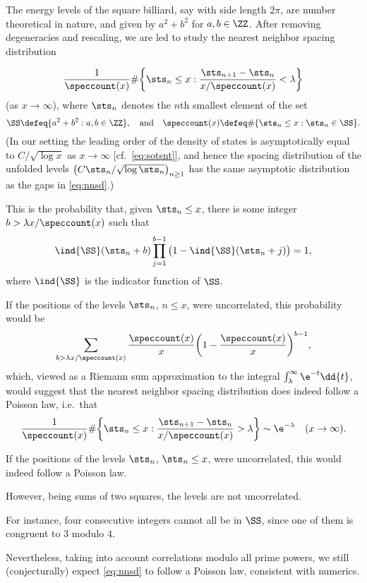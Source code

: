 \documentclass[12pt, reqno, twoside, letterpaper]{amsart}
\begin{document}
The energy levels of the square billiard, say with side length 
$2\pi$, are number theoretical in nature, and given by 
$a^2 + b^2$ for $a,b \in \ZZ$.
%
After removing degeneracies and rescaling, we are led to study 
the nearest neighbor spacing distribution 

\begin{equation}
 \label{eq:nnsd}
 \frac{1}{\speccount(x)}
  \#
   \bigg\{
    \sts_{n} \le x : \frac{\sts_{n + 1} - \sts_{n}}{x/\speccount(x)} < \lambda 
   \bigg\} 
\end{equation}
(as $x \to \infty$), where $\sts_n$ denotes the $n$th smallest 
element of the set  
\begin{equation}
 \label{eq:defSSN}
 \SS \defeq \{a^2 + b^2 : a,b \in \ZZ\}, 
  \quad 
   \text{and}
    \quad 
     \speccount(x)
      \defeq 
       \#\{\sts_{n} \le x : \sts_n \in \SS\}.
\end{equation}
%
(In our setting the leading order of the density of states is
asymptotically equal to $C/\sqrt{\log x}$ as $x \to \infty$ [cf.\   
\eqref{eq:sotsnt}], and hence the spacing distribution of the 
unfolded levels $\big(C\sts_n/\sqrt{\log \sts_n}\big)_{n \ge 1}$ 
has the same asymptotic distribution as the gaps in 
\eqref{eq:nnsd}.)

%
\begin{nixnix}
% 
This is the probability that, given $\sts_n \le x$, there is some 
integer $b > \lambda x/\speccount(x)$ such that 
\[
\ind{\SS}(\sts_n + b)
 \prod_{j = 1}^{b - 1} 
  \big(1 - \ind{\SS}(\sts_n + j)\big)
   =
    1,
\]
where $\ind{\SS}$ is the indicator function of $\SS$.

If the positions of the levels $\sts_n$, $n \le x$, were 
uncorrelated, this probability would be 
\[
\sum_{b > \lambda x/\speccount(x)}
 \frac{\speccount(x)}{x}
  \bigg(1 - \frac{\speccount(x)}{x}\bigg)^{b - 1},
\]
which, viewed as a Riemann sum approximation to the integral 
$\int_{\lambda}^{\infty} \e^{-t} \dd{t}$, would suggest that 
the nearest neighbor spacing distribution does indeed follow 
a Poisson law, i.e.\ that 
\[
\frac{1}{\speccount(x)}
 \#\bigg\{\sts_{n} \le x : \frac{\sts_{n + 1} - \sts_{n}}{x/\speccount(x)} > \lambda \bigg\}
  \sim 
   \e^{-\lambda}
    \quad 
     (x \to \infty).
\]

If the positions of the levels $\sts_n$, $\sts_n \le x$, were 
uncorrelated, this would indeed follow a Poisson law.

However, being sums of two squares, the levels are not 
uncorrelated.

For instance, four consecutive integers cannot all be in $\SS$, 
since one of them is congruent to $3$ modulo $4$.

Nevertheless, taking into account correlations modulo all prime 
powers, we still (conjecturally) expect \eqref{eq:nnsd} to follow 
a Poisson law, consistent with numerics.
%
\end{nixnix}
%
\end{document}
